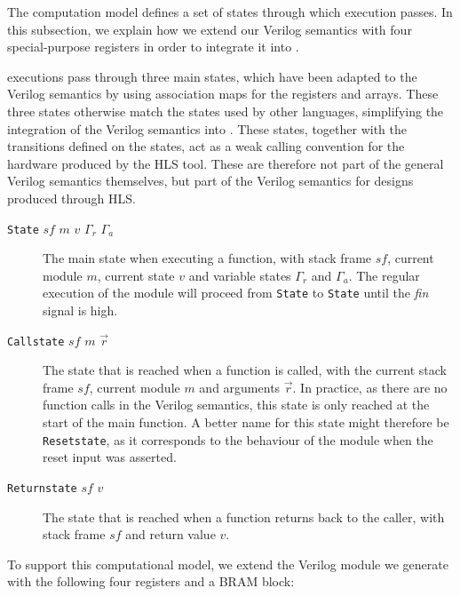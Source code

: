 The \compcert{} computation model defines a set of states through which
execution passes. In this subsection, we explain how we extend our Verilog
semantics with four special-purpose registers in order to integrate it into
\compcert{}.

\compcert{} executions pass through three main states, which have been adapted
to the Verilog semantics by using association maps for the registers and arrays.
These three states otherwise match the states used by other languages,
simplifying the integration of the Verilog semantics into \compcert{}.  These
states, together with the transitions defined on the states, act as a weak
calling convention for the hardware produced by the \gls{HLS} tool.  These are
therefore not part of the general Verilog semantics themselves, but part of the
Verilog semantics for designs produced through \gls{HLS}.
\begin{description}
\item[\texttt{State} $\mathit{sf}$ $m$ $v$ $\Gamma_{r}$ $\Gamma_{a}$] The main
  state when executing a function, with stack frame $\mathit{sf}$, current
  module $m$, current state $v$ and variable states $\Gamma_{r}$ and
  $\Gamma_{a}$.  The regular execution of the module will proceed from
  \texttt{State} to \texttt{State} until the \textit{fin} signal is high.
  \item[\texttt{Callstate} $\mathit{sf}$ $m$ $\vec{r}$] The state that is
    reached when a function is called, with the current stack frame
    $\mathit{sf}$, current module $m$ and arguments $\vec{r}$.  In practice, as
    there are no function calls in the Verilog semantics, this state is only
    reached at the start of the main function.  A better name for this state
    might therefore be \texttt{Resetstate}, as it corresponds to the behaviour
    of the module when the reset input was asserted.
  \item[\texttt{Returnstate} $\mathit{sf}$ $v$] The state that is reached when a
    function returns back to the caller, with stack frame $\mathit{sf}$ and
    return value $v$.
\end{description}

To support this computational model, we extend the Verilog module we generate
with the following four registers and a \gls{BRAM} block:

